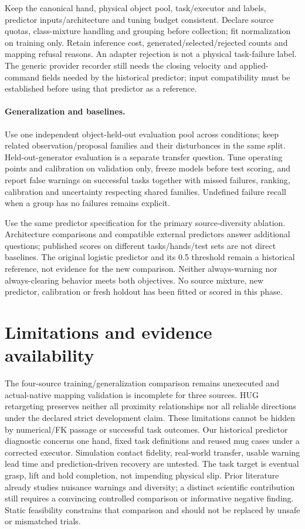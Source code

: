 \documentclass[10pt,letterpaper]{article}
\begin{document}
Keep the canonical hand, physical object pool, task/executor and labels,
predictor inputs/architecture and tuning budget consistent. Declare source
quotas, class-mixture handling and grouping before collection; fit normalization
on training only. Retain inference cost, generated/selected/rejected counts and
mapping refusal reasons. An adapter rejection is not a physical task-failure
label. The generic provider recorder still needs the closing velocity and
applied-command fields needed by the historical predictor; input compatibility
must be established before using that predictor as a reference.

\paragraph{Generalization and baselines.}
Use one independent object-held-out evaluation pool across conditions; keep
related observation/proposal families and their disturbances in the same split.
Held-out-generator evaluation is a separate transfer question. Tune operating
points and calibration on validation only, freeze models before test scoring,
and report false warnings on successful tasks together with missed failures,
ranking, calibration and uncertainty respecting shared families. Undefined
failure recall when a group has no failures remains explicit.

Use the same predictor specification for the primary source-diversity ablation.
Architecture comparisons and compatible external predictors answer additional
questions; published scores on different tasks/hands/test sets are not direct
baselines. The original logistic predictor and its 0.5 threshold remain a
historical reference, not evidence for the new comparison. Neither always-warning
nor always-clearing behavior meets both objectives. No source mixture, new
predictor, calibration or fresh holdout has been fitted or scored in this phase.

\section{Limitations and evidence availability}
The four-source training/generalization comparison remains unexecuted and
actual-native mapping validation is incomplete for three sources. HUG
retargeting preserves neither all proximity relationships nor all reliable
directions under the declared strict development claim. These limitations
cannot be hidden by numerical/FK passage or successful task outcomes.
Our historical predictor diagnostic concerns one hand, fixed task definitions and reused
mug cases under a corrected executor. Simulation contact fidelity, real-world
transfer, usable warning lead time and prediction-driven recovery are untested.
The task target is eventual grasp, lift and hold completion, not impending
physical slip. Prior literature already studies nuisance warnings and diversity;
a distinct scientific contribution still requires a convincing controlled
comparison or informative negative finding. Static feasibility constrains that
comparison and should not be replaced by unsafe or mismatched trials.
\end{document}
